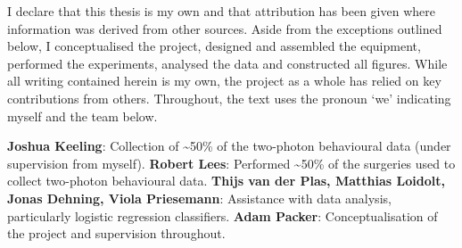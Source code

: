 I declare that this thesis is my own and that attribution has been given where information was derived from other sources. Aside from the exceptions outlined below, I conceptualised the project, designed and assembled the equipment, performed the experiments, analysed the data and constructed all figures. While all writing contained herein is my own, the project as a whole has relied on key contributions from others. Throughout, the text uses the pronoun `we' indicating myself and the team below.

\textbf{Joshua Keeling}: Collection of \textasciitilde 50\% of the two-photon behavioural data (under supervision from myself). \textbf{Robert Lees}: Performed \textasciitilde 50\% of the surgeries used to collect two-photon behavioural data. \textbf{Thijs van der Plas, Matthias Loidolt, Jonas Dehning, Viola Priesemann}: Assistance with data analysis, particularly logistic regression classifiers. \textbf{Adam Packer}: Conceptualisation of the project and supervision throughout.